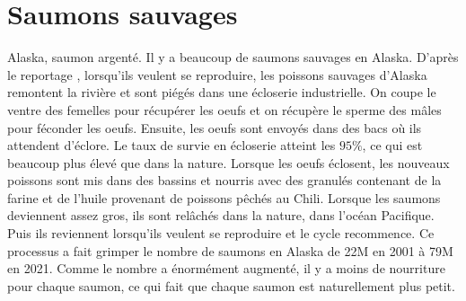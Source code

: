 \documentclass{article}
\begin{document}
\section{Saumons sauvages}
Alaska, saumon argenté. Il y a beaucoup de saumons sauvages en Alaska.
D'après le reportage \cite{FT1}, lorsqu'ils veulent se reproduire, les poissons sauvages d'Alaska remontent la rivière et sont piégés dans une écloserie industrielle. On coupe le ventre des femelles pour récupérer les oeufs et on récupère le sperme des mâles pour féconder les oeufs. Ensuite, les oeufs sont envoyés dans des bacs
où ils attendent d'éclore. Le taux de survie en écloserie atteint les $95\%$, ce qui est beaucoup plus élevé que dans la nature. Lorsque les oeufs éclosent, les nouveaux poissons sont mis dans des bassins et nourris avec des granulés contenant de la farine et de l'huile provenant de poissons pêchés au Chili.
Lorsque les saumons deviennent assez gros, ils sont relâchés dans la nature, dans l'océan Pacifique. Puis ils reviennent lorsqu'ils veulent se reproduire et le cycle recommence. Ce processus a fait grimper le nombre de saumons en Alaska de 22M en 2001 à 79M en 2021. Comme le nombre a énormément augmenté, il y a moins de nourriture pour chaque saumon, ce qui fait que chaque saumon est naturellement plus petit.

\newpage
\printbibliography
\end{document}
